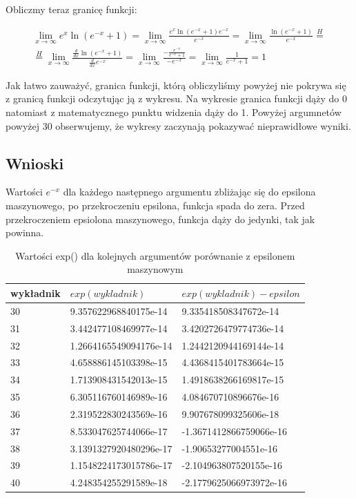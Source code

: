 \documentclass{article}
\begin{document}
Obliczmy teraz granicę funkcji:

\begin{multline}
    \lim_{x \to \infty}{e^x \ln(e^{-x}+1) = \lim_{x \to \infty}{\frac{e^x \ln(e^{-x} + 1)e^{-x}}{e^{-x}}}} = \lim_{x \to \infty}{\frac{\ln(e^{-x}+1)}{e^{-x}}} \stackrel{H}{=} \\ \stackrel{H}{=} \lim_{x \to \infty} {\frac{\frac{d}{dx} \ln(e^{-x} + 1)}{\frac{d}{dx} e^{-x}}} = \lim_{x \to \infty}{\frac{-\frac{e^{-x}}{e^{-x}+1}}{-e^{-x}}} = \lim_{x \to \infty} {\frac{1}{e^{-x}+1} = 1} 
\end{multline}

Jak łatwo zauważyć, granica funkcji, którą obliczyliśmy powyżej nie pokrywa się z granicą funkcji odczytując ją z wykresu. Na wykresie granica funkcji dąży do 0 natomiast z matematycznego punktu widzenia dąży do 1. Powyżej argumnetów powyżej 30 obserwujemy, że wykresy zaczynają pokazywać nieprawidłowe wyniki.

\subsection{Wnioski}

Wartości \(e^{-x}\) dla każdego następnego argumentu zbliżając się do epsilona maszynowego, po przekroczeniu epsilona, funkcja spada do zera. Przed przekroczeniem epsiolona maszynowego, funkcja dąży do jedynki, tak jak powinna.

\begin{table}[h!]
    \centering
    \begin{tabular}{|l|l|l|}
    \hline
    wykładnik & \(exp(wykladnik)\) & \(exp(wykladnik) - epsilon \)\\
    \hline
    30 & 9.357622968840175e-14 & 9.335418508347672e-14\\
    31 & 3.442477108469977e-14 & 3.4202726479774736e-14\\
    32 & 1.2664165549094176e-14 & 1.2442120944169144e-14\\
    33 & 4.658886145103398e-15 & 4.4368415401783664e-15\\
    34 & 1.713908431542013e-15 & 1.4918638266169817e-15\\
    35 & 6.305116760146989e-16 & 4.084670710896676e-16\\
    36 & 2.319522830243569e-16 & 9.907678099325606e-18\\
    \hline
    37 & 8.533047625744066e-17 & -1.3671412866759066e-16\\
    38 & 3.1391327920480296e-17 & -1.90653277004551e-16\\
    39 & 1.1548224173015786e-17 & -2.104963807520155e-16\\
    40 & 4.248354255291589e-18 & -2.1779625066973972e-16\\
     \hline
    \end{tabular}
    \caption{Wartości exp() dla kolejnych argumentów porównanie z epsilonem maszynowym}
    \label{table:3}
\end{table}
\end{document}
